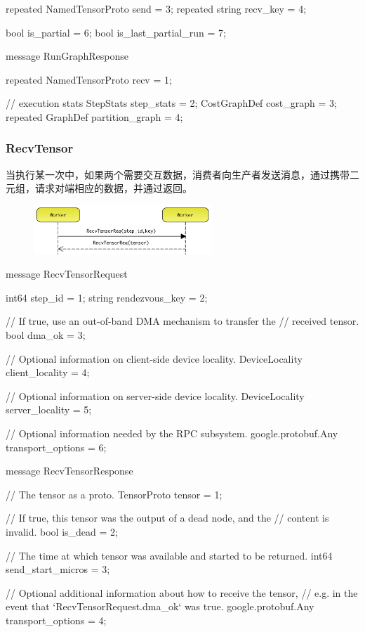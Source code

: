 \begin{content}
\begin{leftbar}
\begin{c++}
{  repeated NamedTensorProto send = 3;
  repeated string recv_key = 4;

  bool is_partial = 6;
  bool is_last_partial_run = 7;
}

message RunGraphResponse {
  repeated NamedTensorProto recv = 1;

  // execution stats
  StepStats step_stats = 2;
  CostGraphDef cost_graph = 3;
  repeated GraphDef partition_graph = 4;
}
\end{c++}
\end{leftbar}

\subsubsection{RecvTensor}

当执行某一次中，如果两个需要交互数据，消费者向生产者发送消息，通过携带二元组，请求对端相应的数据，并通过返回。

\begin{figure}[H]
\centering
\includegraphics[width=0.6\textwidth]{figures/dist-worker-recv-tensor.png}
\caption{}
 \label{fig:dist-worker-recv-tensor}
\end{figure}

\begin{leftbar}
\begin{c++}
message RecvTensorRequest {
  int64 step_id = 1;
  string rendezvous_key = 2;

  // If true, use an out-of-band DMA mechanism to transfer the
  // received tensor.
  bool dma_ok = 3;

  // Optional information on client-side device locality.
  DeviceLocality client_locality = 4;

  // Optional information on server-side device locality.
  DeviceLocality server_locality = 5;

  // Optional information needed by the RPC subsystem.
  google.protobuf.Any transport_options = 6;
}

message RecvTensorResponse {
  // The tensor as a proto.
  TensorProto tensor = 1;

  // If true, this tensor was the output of a dead node, and the
  // content is invalid.
  bool is_dead = 2;

  // The time at which tensor was available and started to be returned.
  int64 send_start_micros = 3;

  // Optional additional information about how to receive the tensor,
  // e.g. in the event that `RecvTensorRequest.dma\_ok` was true.
  google.protobuf.Any transport_options = 4;
}
\end{c++}
\end{leftbar}

\end{content}


